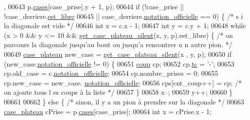 \begin{DoxyCode}
      ,
00643                                 p.\hyperlink{structplateau_a6afaa60f594542e0d742b0c6d3223392}{cases}[case\_prise].y + 1, p);
00644                 \textcolor{keywordflow}{if} (!case\_prise || !case\_derriere.\hyperlink{structcase__plateau_a173f25d2fd7c653d77ca8174ba4f636d}{est_libre}
00645                                 || case\_derriere.\hyperlink{structcase__plateau_ad510581b324604a9cf685cbb769a421a}{notation_officielle} == 0) \{ \textcolor{comment}{/* s
      i la diagonale est vide */}
00646                         \textcolor{keywordtype}{int} x = c.x - 1;
00647                         \textcolor{keywordtype}{int} y = c.y + 1;
00648                         \textcolor{keywordflow}{while} (x > 0 && y <= 10 && \hyperlink{plateau_8h_a60a8f706865d0ae9087f8d65d4667655}{get_case_plateau_silent}(x, y, 
      p).est\_libre) \{ \textcolor{comment}{/* on parcours la diagonale jusqu'au bout ou jusqu'a rencontrer u
      n autre pion. */}
00649                                 \hyperlink{structcase__plateau}{case_plateau} new\_case = \hyperlink{plateau_8h_a60a8f706865d0ae9087f8d65d4667655}{get_case_plateau_silent}(x
      , y, p);
00650                                 \textcolor{keywordflow}{if} (new\_case.\hyperlink{structcase__plateau_ad510581b324604a9cf685cbb769a421a}{notation_officielle} != 0) \{
00651                                         \hyperlink{structcoup}{coup} cp;
00652                                         cp.\hyperlink{structcoup_aa33da004dccb192cb33bc00c26c6e859}{tc} = \textcolor{charliteral}{'-'};
00653                                         cp.old\_case = c.\hyperlink{structcase__plateau_ad510581b324604a9cf685cbb769a421a}{notation_officielle};
00654                                         cp.nombre\_prises = 0;
00655                                         cp.new\_case = new\_case.
      \hyperlink{structcase__plateau_ad510581b324604a9cf685cbb769a421a}{notation_officielle};
00656                                         cps[cnt\_coup++] = cp; \textcolor{comment}{/* on ajoute tous l
      es coups à la liste */}
00657                                 \}
00658                                 x--;
00659                                 y++;
00660                         \}
00661 
00662                 \} \textcolor{keywordflow}{else} \{ \textcolor{comment}{/* sinon, il y a un pion à prendre sur la diagonale */}
00663                         \hyperlink{structcase__plateau}{case_plateau} cPrise = p.\hyperlink{structplateau_a6afaa60f594542e0d742b0c6d3223392}{cases}[case\_prise];
00664                         \textcolor{keywordtype}{int} x = cPrise.x - 1;

\end{DoxyCode}
